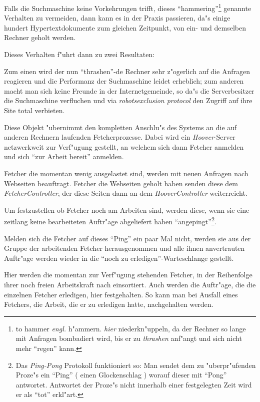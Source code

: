 \begin{description}
Falls die Suchmaschine keine Vorkehrungen trifft, dieses "`hammering"'\footnote{to hammer {\em engl.} h"ammern. {\em hier} niederkn"uppeln, da der Rechner so lange mit Anfragen bombadiert wird, bis er zu {\em thrashen} anf"angt und sich nicht mehr "`regen"' kann.} genannte Verhalten zu vermeiden, dann kann es in der Praxis passieren, da"s einige hundert Hypertextdokumente zum gleichen Zeitpunkt, von ein- und demselben Rechner geholt werden.

Dieses Verhalten f"uhrt dann zu zwei Resultaten:

Zum einen wird der nun "`thrashen"'-de Rechner sehr z"ogerlich auf die Anfragen reagieren und die Performanz der Suchmaschine leidet erheblich; zum anderen macht man sich keine Freunde in der Internetgemeinde, so da"s die Serverbesitzer die Suchmaschine verfluchen und via {\em robotsexclusion protocol} den Zugriff auf ihre Site total verbieten.


\item[FetcherController:]	Diese Objekt "ubernimmt den kompletten Anschlu"s des Systems an die auf anderen Rechnern laufenden Fetcherprozesse. Dabei wird ein {\em Hoover}-Server netzwerkweit zur Verf"ugung gestellt, an welchem sich dann Fetcher anmelden und sich "`zur Arbeit bereit"' anmelden.

Fetcher die momentan wenig ausgelastet sind, werden mit neuen Anfragen nach Webseiten beauftragt. Fetcher die Webseiten geholt haben senden diese dem {\em FetcherController}, der diese Seiten dann an dem {\em HooverController} weiterreicht.

Um festzustellen ob Fetcher noch am Arbeiten sind, werden diese, wenn sie eine zeitlang keine bearbeiteten Auftr"age abgeliefert haben "`angepingt"'\footnote{Das {\em Ping-Pong} Protokoll funktioniert so: Man sendet dem zu "uberpr"ufenden Proze"s ein "`Ping"' ( einen Glockenschlag ) worauf dieser mit "`Pong"' antwortet. Antwortet der Proze"s nicht innerhalb einer festgelegten Zeit wird er als "`tot"' erkl"art.}.

Melden sich die Fetcher auf dieses "`Ping"' ein paar Mal nicht, werden sie aus der Gruppe der arbeitenden Fetcher herausgenommen und alle ihnen anvertrauten Auftr"age werden wieder in die "`noch zu erledigen"'-Warteschlange gestellt.


\item[FetcherArray:]	Hier werden die momentan zur Verf"ugung stehenden Fetcher, in der Reihenfolge ihrer noch freien Arbeitskraft nach einsortiert. Auch werden die Auftr"age, die die einzelnen Fetcher erledigen, hier festgehalten. So kann man bei Ausfall eines Fetchers, die Arbeit, die er zu erledigen hatte, nachgehalten werden.

\end{description}


